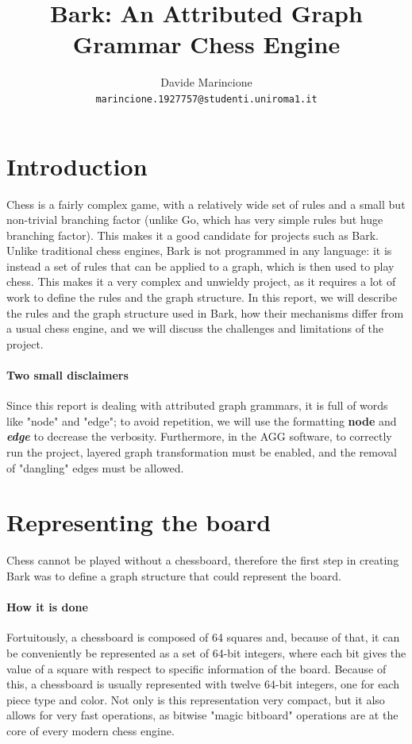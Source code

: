 \documentclass[a4paper, 10pt]{scrartcl}
\title{Bark: An Attributed Graph Grammar Chess Engine}
\author{Davide Marincione\\\small\texttt{marincione.1927757@studenti.uniroma1.it}}
\newcommand{\noderepr}[1]{\textsf{\textbf{#1}}}
\newcommand{\edgerepr}[1]{\textit{\textbf{#1}}}
\begin{document}
    \maketitle
    \section{Introduction}
    Chess is a fairly complex game, with a relatively wide set of rules and a small but non-trivial branching factor (unlike Go, which has very simple rules but huge branching factor). This makes it a good candidate for projects such as Bark. Unlike traditional chess engines, Bark is not programmed in any language: it is instead a set of rules that can be applied to a graph, which is then used to play chess. This makes it a very complex and unwieldy project, as it requires a lot of work to define the rules and the graph structure. In this report, we will describe the rules and the graph structure used in Bark, how their mechanisms differ from a usual chess engine, and we will discuss the challenges and limitations of the project.

    \paragraph{Two small disclaimers} Since this report is dealing with attributed graph grammars, it is full of words like "node" and "edge"; to avoid repetition, we will use the formatting \noderepr{node} and \edgerepr{edge} to decrease the verbosity. Furthermore, in the AGG software, to correctly run the project, layered graph transformation must be enabled, and the removal of "dangling" edges must be allowed.

    \section{Representing the board}
    Chess cannot be played without a chessboard, therefore the first step in creating Bark was to define a graph structure that could represent the board.
    \paragraph{How it is done} Fortuitously, a chessboard is composed of 64 squares and, because of that, it can be conveniently be represented as a set of 64-bit integers, where each bit gives the value of a square with respect to specific information of the board. Because of this, a chessboard is usually represented with twelve 64-bit integers, one for each piece type and color. Not only is this representation very compact, but it also allows for very fast operations, as bitwise "magic bitboard" operations are at the core of every modern chess engine.
\end{document}
